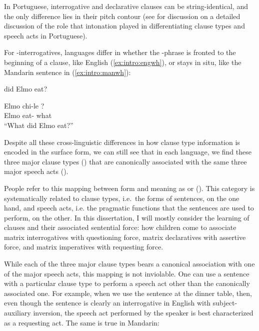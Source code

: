 In Portuguese, interrogative and declarative clauses can be string-identical, and the only difference lies in their pitch contour (see \cite{truckenbrodt2009prosody} for discussion on a detailed discussion of the role that intonation played in differentiating clause types and speech acts in Portuguese). 

For \twh-interrogatives, languages differ in whether the \twh-phrase is fronted to the beginning of a clause,  like English (\ref{ex:intro:engwh}), or stays in situ, like the Mandarin sentence in (\ref{ex:intro:manwh}):

 did Elmo eat?
\eex

\gll Elmo chi-le ?\\
Elmo eat-\Asp{} what\\
``What did Elmo eat?''
\eex

Despite all these cross-linguistic differences in how clause type information is encoded in the surface form, we can still see that in each language, we find these three major clause types (\diis{}) that are canonically associated with the same three major speech acts (\aqrs{}). 

People refer to this mapping between form and meaning as  or  (\cite{chierchia1990textbook, portner2018}). This category is systematically related to clause types, i.e.~the forms of sentences, on the one hand, and speech acts, i.e. the pragmatic functions that the sentences are used to perform, on the other. In this dissertation, I will mostly consider the learning of  clauses and their associated sentential force: how children come to associate matrix interrogatives with questioning force, matrix declaratives with assertive force, and matrix imperatives with requesting force. 

While each of the three major clause types bears a canonical association with one of the major speech acts, this mapping is not inviolable. One can use a sentence with a particular clause type to perform a speech act other than the canonically associated one. For example, when we use the sentence  at the dinner table, then, even though the sentence is clearly an interrogative in English with subject-auxiliary inversion, the speech act performed by the speaker is best characterized as a requesting act. The same is true in Mandarin:

